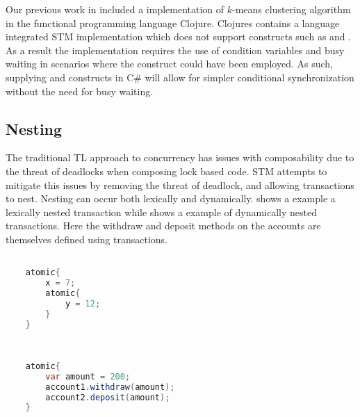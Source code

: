 Our previous work in \cite{dpt907e14trending} included a implementation of $k$-means clustering algorithm\cite[p. 451]{dataminingconceptsandtechniques} in the functional programming language Clojure. Clojures contains a language integrated \ac{STM} implementation which does not support constructs such as  and . As a result the implementation requires the use of condition variables and busy waiting in scenarios where the  construct could have been employed\cite{duffy2010stmnet}.  As such, supplying  and  constructs in C\# will allow for simpler conditional synchronization without the need for busy waiting.

\subsection{Nesting}
The traditional \ac{TL} approach to concurrency has issues with composability due to the threat of deadlocks\cite[p. 58]{sutter2005software} when composing lock based code. \ac{STM} attempts to mitigate this issues by removing the threat of deadlock, and allowing transactions to nest. Nesting can occur both lexically and dynamically\cite[p. 1]{kumar2011hparstm}\cite[p. 42]{harris2010transactional}\cite[p. 2081]{herlihy2011tm}.  shows a example a lexically nested transaction while  shows a example of dynamically nested transactions. Here the withdraw and deposit methods on the accounts are themselves defined using transactions.

\begin{lstlisting}[label=lst:stm_nested_transactions,
  caption={Lexically nested transactions},
  language=Java,  
  showspaces=false,
  showtabs=false,
  breaklines=true,
  showstringspaces=false,
  breakatwhitespace=true,
  commentstyle=\color{greencomments},
  keywordstyle=\color{bluekeywords},
  stringstyle=\color{redstrings},
  morekeywords={atomic, retry, orElse, var}]  % Start your code-block

	atomic{
		x = 7;
		atomic{
			y = 12;		
		}
	}
       
\end{lstlisting}

\begin{lstlisting}[label=lst:stm_nested_transactions_real,
  caption={Dynamically nested transactions},
  language=Java,  
  showspaces=false,
  showtabs=false,
  breaklines=true,
  showstringspaces=false,
  breakatwhitespace=true,
  commentstyle=\color{greencomments},
  keywordstyle=\color{bluekeywords},
  stringstyle=\color{redstrings},
  morekeywords={atomic, retry, orElse, var}]  % Start your code-block

	atomic{
		var amount = 200;
		account1.withdraw(amount);
		account2.deposit(amount);
	}
       
\end{lstlisting}

